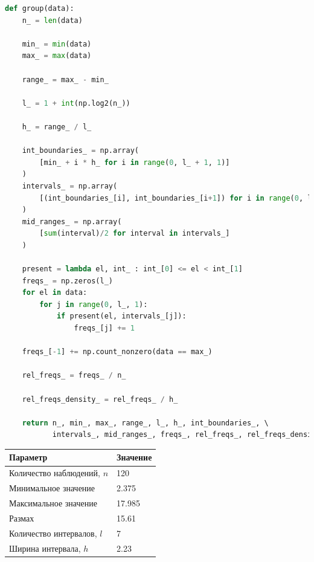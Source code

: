 \documentclass[a4paper, 14pt]{extarticle}
\begin{document}
\begin{center}
  \begin{lstlisting}[language=Python]
def group(data):
    n_ = len(data)

    min_ = min(data)
    max_ = max(data)

    range_ = max_ - min_

    l_ = 1 + int(np.log2(n_))

    h_ = range_ / l_

    int_boundaries_ = np.array(
        [min_ + i * h_ for i in range(0, l_ + 1, 1)]
    )
    intervals_ = np.array(
        [(int_boundaries_[i], int_boundaries_[i+1]) for i in range(0, l_, 1)]
    )
    mid_ranges_ = np.array(
        [sum(interval)/2 for interval in intervals_]
    )

    present = lambda el, int_ : int_[0] <= el < int_[1]
    freqs_ = np.zeros(l_)
    for el in data:
        for j in range(0, l_, 1):
            if present(el, intervals_[j]):
                freqs_[j] += 1 

    freqs_[-1] += np.count_nonzero(data == max_)

    rel_freqs_ = freqs_ / n_

    rel_freqs_density_ = rel_freqs_ / h_

    return n_, min_, max_, range_, l_, h_, int_boundaries_, \ 
           intervals_, mid_ranges_, freqs_, rel_freqs_, rel_freqs_density_
  \end{lstlisting}
\end{center}

\begin{center}
    \renewcommand{\arraystretch}{1.5}
    \begin{tabular}{ll}
        \toprule
        \textbf{Параметр} & \textbf{Значение} \\
        \midrule
        Количество наблюдений, \( n \) & 120 \\
        Минимальное значение & 2.375 \\
        Максимальное значение & 17.985 \\
        Размах & 15.61 \\
        Количество интервалов, \( l \) & 7 \\
        Ширина интервала, \( h \) & 2.23 \\
        \bottomrule
    \end{tabular}
\end{center}
\end{document}
